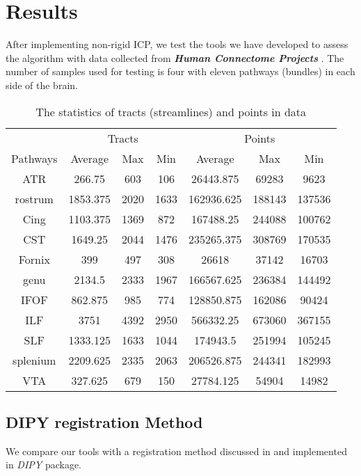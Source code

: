 \documentclass[../structure.tex]{subfiles}
\begin{document}
\chapter{Results}
\hspace{2em}After implementing non-rigid ICP, we test the tools we have developed to assess the algorithm with data collected from \textbf{\textit{Human Connectome Projects}} \cite{CCF}. The number of samples used for testing is four with eleven pathways (bundles) in each side of the brain.

\begin{center}
\begin{table}[h!]
	\begin{tabular}{| c | c  c  c | c  c  c |}
	\toprule
	&\multicolumn{3}{c}{Tracts}&\multicolumn{3}{c}{Points}\\
Pathways&Average&Max&Min&Average&Max&Min\\
\midrule
ATR&266.75&603&106&26443.875&69283&9623\\
rostrum&1853.375&2020&1633&162936.625&188143&137536\\
Cing&1103.375&1369&872&167488.25&244088&100762\\
CST&1649.25&2044&1476&235265.375&308769&170535\\
Fornix&399&497&308&26618&37142&16703\\
genu&2134.5&2333&1967&166567.625&236384&144492\\
IFOF&862.875&985&774&128850.875&162086&90424\\
ILF&3751&4392&2950&566332.25&673060&367155\\
SLF&1333.125&1633&1044&174943.5&251994&105245\\
splenium&2209.625&2335&2063&206526.875&244341&182993\\
VTA&327.625&679&150&27784.125&54904&14982\\
\bottomrule
	\end{tabular}
\caption{The statistics of tracts (streamlines) and points in data}
\label{table:data}
\end{table}
\end{center}

\section{DIPY registration Method}
We compare our tools with a registration method discussed in \cite{Garyfallidis2015} and implemented in \textit{DIPY} package.
\end{document}

